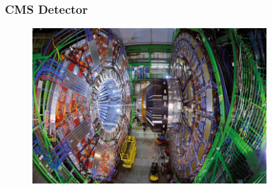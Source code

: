 \begin{frame}
\frametitle{CMS Detector}

\begin{figure}[htbp]
\begin{center}
\includegraphics[width=0.8\textwidth]{images/CMS_CC204_05_13.jpeg}
\end{center}
\end{figure}


\end{frame}


